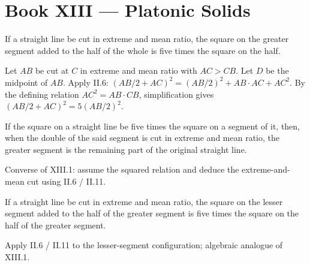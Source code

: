 \documentclass{rrxiv}
\begin{document}
\section{Book XIII --- Platonic Solids}
\label{sec:book-XIII}

\begin{claim}
\label{prop:XIII.1}
If a straight line be cut in extreme and mean ratio, the square on
the greater segment added to the half of the whole is five times the
square on the half.
\end{claim}
\begin{evidence}
\label{ev:XIII.1}
Let $AB$ be cut at $C$ in extreme and mean ratio with $AC > CB$.
Let $D$ be the midpoint of $AB$.  Apply II.6: $(AB/2 + AC)^2 =
(AB/2)^2 + AB \cdot AC + AC^2$.  By the defining relation $AC^2 =
AB \cdot CB$, simplification gives $(AB/2 + AC)^2 = 5 (AB/2)^2$.
\end{evidence}

\begin{claim}
\label{prop:XIII.2}
If the square on a straight line be five times the square on a
segment of it, then, when the double of the said segment is cut in
extreme and mean ratio, the greater segment is the remaining part of
the original straight line.
\end{claim}
\begin{evidence}
\label{ev:XIII.2}
Converse of XIII.1: assume the squared relation and deduce the
extreme-and-mean cut using II.6 / II.11.
\end{evidence}

\begin{claim}
\label{prop:XIII.3}
If a straight line be cut in extreme and mean ratio, the square on
the lesser segment added to the half of the greater segment is five
times the square on the half of the greater segment.
\end{claim}
\begin{evidence}
\label{ev:XIII.3}
Apply II.6 / II.11 to the lesser-segment configuration; algebraic
analogue of XIII.1.
\end{evidence}
\end{document}
